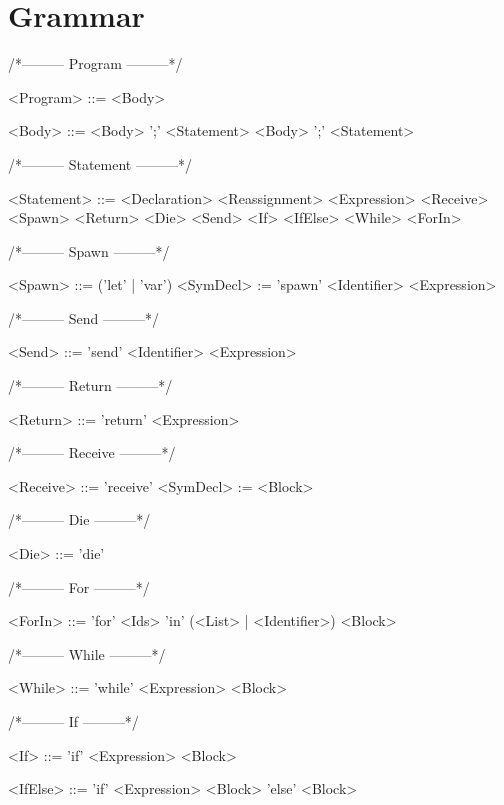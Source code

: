 \section{Grammar}
\setlength{\grammarindent}{100pt}
/*--------- Program ---------*/
\begin{grammar}
<Program> ::= <Body>

<Body> ::= <Body> ';' <Statement>
 \alt <Body> ';'
 \alt <Statement>

\end{grammar}
/*--------- Statement ---------*/
\begin{grammar}
<Statement> ::= <Declaration>
 \alt <Reassignment>
 \alt <Expression>
 \alt <Receive>
 \alt <Spawn>
 \alt <Return>
 \alt <Die>
 \alt <Send>
 \alt <If>
 \alt <IfElse>
 \alt <While>
 \alt <ForIn>

\end{grammar}
/*--------- Spawn ---------*/
\begin{grammar}
<Spawn> ::= ('let' | 'var') <SymDecl> := 'spawn' <Identifier> <Expression>

\end{grammar}
/*--------- Send ---------*/
\begin{grammar}
<Send> ::= 'send' <Identifier> <Expression>

\end{grammar}
/*--------- Return ---------*/
\begin{grammar}
<Return> ::= 'return' <Expression>

\end{grammar}
/*--------- Receive ---------*/
\begin{grammar}
<Receive> ::= 'receive' <SymDecl> := <Block>

\end{grammar}
/*--------- Die ---------*/
\begin{grammar}
<Die> ::= 'die'

\end{grammar}
/*--------- For ---------*/
\begin{grammar}
<ForIn> ::= 'for' <Ids> 'in' (<List> | <Identifier>) <Block>

\end{grammar}
/*--------- While ---------*/
\begin{grammar}
<While> ::= 'while' <Expression> <Block>

\end{grammar}
/*--------- If ---------*/
\begin{grammar}
<If> ::= 'if' <Expression> <Block>

<IfElse> ::= 'if' <Expression> <Block> 'else' <Block>

\end{grammar}
